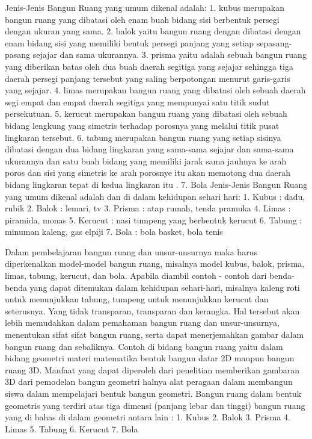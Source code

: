 Jenis-Jenis Bangun Ruang yang umum dikenal adalah:
1. kubus merupakan bangun ruang yang dibatasi oleh enam buah bidang sisi berbentuk persegi dengan ukuran yang sama.
2. balok yaitu bangun ruang dengan dibatasi dengan enam bidang sisi yang memiliki bentuk persegi panjang yang setiap sepasang-pasang sejajar dan sama ukurannya.
3. prisma yaitu adalah sebuah bangun ruang yang diberikan batas oleh dua buah daerah segitiga yang sejajar sehingga tiga daerah persegi panjang tersebut yang saling berpotongan menurut garis-garis yang sejajar.
4. limas merupakan bangun ruang yang dibatasi oleh sebuah daerah segi empat dan empat daerah segitiga yang mempunyai satu titik sudut persekutuan.
5. kerucut merupakan bangun ruang yang dibatasi oleh sebuah bidang lengkung yang simetris terhadap porosnya yang melalui titik pusat lingkaran tersebut.
6. tabung merupakan bangun ruang yang setiap sisinya dibatasi dengan dua bidang lingkaran yang sama-sama sejajar dan sama-sama ukurannya dan satu buah bidang 
     yang memiliki jarak sama jauhnya ke arah poros dan sisi yang simetris ke arah porosnye itu akan memotong dua daerah bidang lingkaran tepat di kedua lingkaran itu .
7. Bola
Jenis-Jenis Bangun Ruang yang umum dikenal adalah dan di dalam kehidupan sehari hari:
1.   Kubus    : dadu, rubik
2.   Balok    : lemari, tv
3.   Prisma   : atap rumah, tenda pramuka
4.   Limas    : piramida, monas
5.   Kerucut  : nasi tumpeng yang berbentuk kerucut
6.   Tabung   : minuman kaleng, gas elpiji
7.   Bola     : bola basket, bola tenis

Dalam pembelajaran bangun ruang dan unsur-unsurnya maka harus diperkenalkan model-model bangun ruang, misalnya model kubus, balok, prisma, limas, tabung, kerucut, dan bola. Apabila diambil contoh - contoh dari benda-benda yang dapat ditemukan dalam kehidupan sehari-hari, misalnya kaleng roti untuk menunjukkan tabung, tumpeng untuk menunjukkan kerucut dan seterusnya. Yang tidak transparan, transparan dan kerangka. Hal tersebut akan lebih memudahkan dalam pemahaman bangun ruang dan unsur-unsurnya, menentukan sifat sifat bangun ruang, serta dapat menerjemahkan gambar dalam bangun ruang dan sebaliknya.
Contoh di bidang bangun ruang yaitu dalam bidang geometri  materi matematika bentuk bangun datar 2D maupun bangun ruang 3D. 
Manfaat yang dapat diperoleh dari penelitian memberikan gambaran 3D dari pemodelan bangun geometri halnya alat peragaan dalam membangun siswa dalam mempelajari bentuk bangun geometri.
Bangun ruang dalam bentuk geometris yang terdiri atas tiga dimensi (panjang lebar dan tinggi) bangun ruang yang di bahas di dalam geometri antara lain :
1.    Kubus
2.    Balok 
3.    Prisma
4.    Limas
5.    Tabung
6.    Kerucut
7.    Bola

